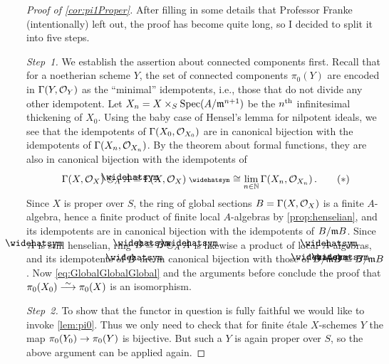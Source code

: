 \documentclass[a4paper, 10pt, oneside, DIV=9, chapterprefix=true, numbers=enddot, bibliography=totoc]{scrbook}
\begin{document}
\begin{proof}[Proof of \cref{cor:pi1Proper}]
	After filling in some details that Professor Franke (intentionally) left out, the proof has become quite long, so I decided to split it into five steps.
	
	\emph{Step~1.} We establish the assertion about connected components first. Recall that for a noetherian scheme $Y$, the set of connected components $\pi_0(Y)$ are encoded in $\operatorname{\Gamma}(Y,\mathcal{O}_Y)$ as the \enquote{minimal} idempotents, i.e., those that do not divide any other idempotent. Let $X_n=X\times_S\operatorname{Spec} (A/\mathfrak{m}^{n+1})$ be the $n^{\text{th}}$ infinitesimal thickening of $X_0$. Using the baby case of Hensel's lemma for nilpotent ideals, we see that the idempotents of $\operatorname{\Gamma}(X_0,\mathcal{O}_{X_0})$ are in canonical bijection with the idempotents of $\operatorname{\Gamma}(X_n,\mathcal{O}_{X_n})$. By the theorem about formal functions, they are also in canonical bijection with the idempotents of
	\begin{equation}\label{eq:GlobalGlobalGlobal}
		\Global(X,\Oo_X)\otimes_A\roof{A}\cong \Global(X,\Oo_X)^\complete\cong \limit_{n\in\IN}\Global(X_n,\Oo_{X_n})\,.\tag{$*$}
	\end{equation}
	Since $X$ is proper over $S$, the ring of global sections $B=\operatorname{\Gamma}(X,\mathcal{O}_X)$ is a finite $A$-algebra, hence a finite product of finite local $A$-algebras by \cref{prop:henselian}, and its idempotents are in canonical bijection with the idempotents of $B/\mathfrak{m} B$. Since $\roof{A}$ is still henselian, ring $\roof{B}\cong B\otimes_A\roof{A}$ is likewise a product of local $\roof{A}$-algebras, and its idempotents of $\roof{B}$ are in canonical bijection with those of $\roof{B}/\mm\roof{B}\cong B/\mm B$. Now \cref{eq:GlobalGlobalGlobal} and the arguments before conclude the proof that $\pi_0(X_0)\isomorphism\pi_0(X)$ is an isomorphism.
	
	\emph{Step~2.} To show that the functor in question is fully faithful we would like to invoke \cref{lem:pi0}. Thus we only need to check that for finite étale $X$-schemes $Y$ the map $\pi_0(Y_0)\morphism\pi_0(Y)$ is bijective. But such a $Y$ is again proper over $S$, so the above argument can be applied again.
	

\end{proof}
\end{document}
